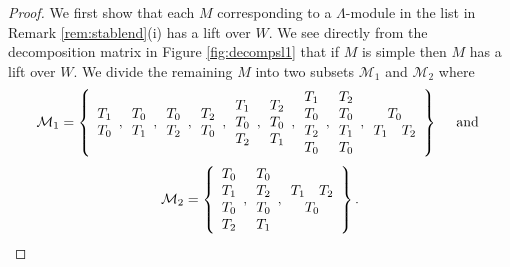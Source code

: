 \documentclass{amsart}
\theoremstyle{plain}
\theoremstyle{definition}
\theoremstyle{remark}
\begin{document}
\begin{proof}
We first show that each $M$ corresponding to a $\Lambda$-module
in the list in Remark \ref{rem:stablend}(i) has a lift over $W$.
We see directly from the decomposition matrix in Figure \ref{fig:decompsl1} that
if $M$ is simple then $M$ has a lift over $W$. We divide the remaining $M$ into two subsets
$\mathcal{M}_1$ and $\mathcal{M}_2$ where
$$\mathcal{M}_1=\left\{\begin{array}{c}T_1\\T_0\end{array}, \begin{array}{c}T_0\\T_1\end{array},
\begin{array}{c}T_0\\T_2\end{array},\begin{array}{c}T_2\\T_0\end{array},
\begin{array}{c}T_1\\T_0\\T_2\end{array},\begin{array}{c}T_2\\T_0\\T_1\end{array},
\begin{array}{c}T_1\\T_0\\T_2\\T_0\end{array},\begin{array}{c}T_2\\T_0\\T_1\\T_0\end{array},
\begin{array}{cc}\multicolumn{2}{c}{T_0}\\T_1&T_2\end{array}\right\}\quad\mbox{ and }$$
$$\mathcal{M}_2=\left\{\begin{array}{c}T_0\\T_1\\T_0\\T_2\end{array}, \begin{array}{c}T_0\\T_2\\T_0\\T_1\end{array},
\begin{array}{cc}T_1&T_2\\\multicolumn{2}{c}{T_0}\end{array}\right\}.$$


\end{proof}
\end{document}
